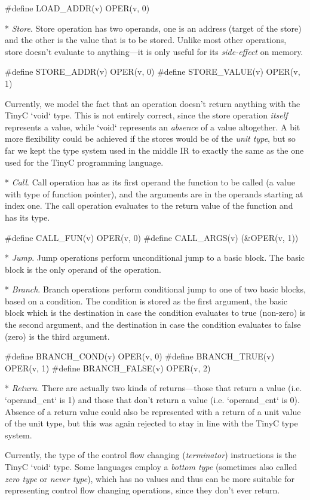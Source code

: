 \begtt
#define LOAD_ADDR(v) OPER(v, 0)
\endtt

* {\em Store}. Store operation has two operands, one is an address (target of
the store) and the other is the value that is to be stored. Unlike most other
operations, store doesn't evaluate to anything---it is only useful for its
{\em side-effect} on memory.

\begtt
#define STORE_ADDR(v)  OPER(v, 0)
#define STORE_VALUE(v) OPER(v, 1)
\endtt

Currently, we model the fact that an operation doesn't return anything with the
TinyC `void` type. This is not entirely correct, since the store operation {\em itself}
represents a value, while `void` represents an {\em absence} of a value
altogether. A bit more flexibility could be achieved if the stores would be of
the {\em unit type}, but so far we kept the type system used in the middle IR to
exactly the same as the one used for the TinyC programming language.

* {\em Call}. Call operation has as its first operand the function to be called
(a value with type of function pointer), and the arguments are in the operands
starting at index one. The call operation evaluates to the return value of the
function and has its type.

\begtt
#define CALL_FUN(v)  OPER(v, 0)
#define CALL_ARGS(v) (&OPER(v, 1))
\endtt

* {\em Jump}. Jump operations perform unconditional jump to a basic block. The
basic block is the only operand of the operation.

* {\em Branch}. Branch operations perform conditional jump to one of two basic
blocks, based on a condition. The condition is stored as the first argument, the
basic block which is the destination in case the condition evaluates to true
(non-zero) is the second argument, and the destination in case the condition
evaluates to false (zero) is the third argument.

\begtt
#define BRANCH_COND(v)  OPER(v, 0)
#define BRANCH_TRUE(v)  OPER(v, 1)
#define BRANCH_FALSE(v) OPER(v, 2)
\endtt

* {\em Return}. There are actually two kinds of returns---those that return a
value (i.e. `operand_cnt` is 1) and those that don't return a value
(i.e. `operand_cnt` is 0). Absence of a return value could also be represented with a
return of a unit value of the unit type, but this was again rejected to stay
in line with the TinyC type system.
\enditems

Currently, the type of the control flow changing ({\em terminator}) instructions
is the TinyC `void` type. Some languages employ a {\em bottom type} (sometimes
also called {\em zero type} or {\em never type}), which has no values and thus
can be more suitable for representing control flow changing operations, since
they don't ever return.

